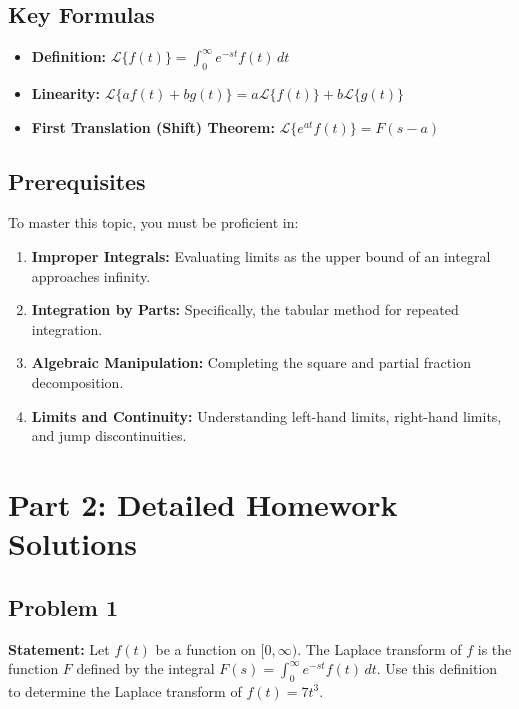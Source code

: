 \documentclass[11pt, a4paper]{article}
\theoremstyle{definition}
\theoremstyle{remark}
\begin{document}
\subsection{Key Formulas}
\begin{itemize}
    \item \textbf{Definition:} $\mathscr{L}\{f(t)\} = \int_{0}^{\infty} e^{-st} f(t) \, dt$
    \item \textbf{Linearity:} $\mathscr{L}\{a f(t) + b g(t)\} = a \mathscr{L}\{f(t)\} + b \mathscr{L}\{g(t)\}$
    \item \textbf{First Translation (Shift) Theorem:} $\mathscr{L}\{e^{at} f(t)\} = F(s - a)$
\end{itemize}

\subsection{Prerequisites}
To master this topic, you must be proficient in:
\begin{enumerate}
    \item \textbf{Improper Integrals:} Evaluating limits as the upper bound of an integral approaches infinity.
    \item \textbf{Integration by Parts:} Specifically, the tabular method for repeated integration.
    \item \textbf{Algebraic Manipulation:} Completing the square and partial fraction decomposition.
    \item \textbf{Limits and Continuity:} Understanding left-hand limits, right-hand limits, and jump discontinuities.
\end{enumerate}

\newpage
\section{Part 2: Detailed Homework Solutions}

\subsection{Problem 1}
\textbf{Statement:} Let $f(t)$ be a function on $[0, \infty)$. The Laplace transform of $f$ is the function $F$ defined by the integral $F(s) = \int_{0}^{\infty} e^{-st} f(t) \, dt$. Use this definition to determine the Laplace transform of $f(t) = 7t^3$.
\end{document}
